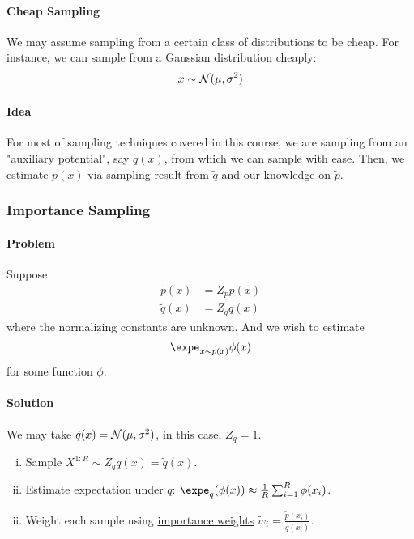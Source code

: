 \documentclass{article}
\begin{document}
	\paragraph{Cheap Sampling} We may assume sampling from a certain class of distributions to be cheap. For instance, we can sample from a Gaussian distribution cheaply:
	\begin{align}
		x \sim \mathcal{{N}}(\mu, \sigma^2)
	\end{align}
	
	\paragraph{Idea} For most of sampling techniques covered in this course, we are sampling from an "auxiliary potential", say $\tilde{q}(x)$, from which we can sample with ease. Then, we estimate $p(x)$ via sampling result from $\tilde{q}$ and our knowledge on $\tilde{p}$.
	
	\subsubsection{Importance Sampling}
	\paragraph{Problem} Suppose
	\begin{align}
		\tilde{p}(x) &= Z_p p(x) \\
		\tilde{q}(x) &= Z_q q(x)
	\end{align}
	where the normalizing constants are unknown. And we wish to estimate 
	\begin{align}
		\expe_{x \sim p(x)} \phi(x)
	\end{align}
	for some function $\phi$.

	\paragraph{Solution} We may take $\tilde{q}(x) = \mathcal{{N}}(\mu, \sigma^2)$, in this case, $Z_q = 1$.
	
	\begin{algorithm} \quad
		\begin{enumerate}[(i)]
			\item Sample $X^{1:R} \sim Z_q q(x)= \tilde{q}(x)$.
			\item Estimate expectation under $q$: $\expe_{q}(\phi(x)) \approx \frac{1}{R} \sum_{i=1}^R \phi(x_i)$.
			\item Weight each sample using \ul{importance weights} $\tilde{w}_i = \frac{\tilde{p}(x_i)}{\tilde{q}(x_i)}$.
		\end{enumerate}
	\end{algorithm}
	
\end{document}
